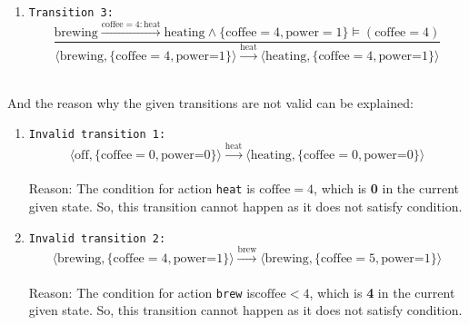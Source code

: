 \documentclass{article}
\begin{document}
\begin{enumerate}[(a)]
\begin{enumerate}[i]
        \item \texttt{Transition 3:}
        $$\frac{
            \text{brewing}\xrightarrow{\text{coffee}=4:\text{heat}} \text{heating}  \wedge \{\text{coffee}=4, \text{power}=1\} \models (\text{coffee}=4)
        }{
            \langle \text{brewing}, \{\text{coffee}=4, \text{power=1}\} \rangle 
            \xrightarrow{\text{heat}}
            \langle \text{heating}, \{\text{coffee}=4, \text{power=1}\} \rangle 
        }$$\\
    \end{enumerate}
    And the reason why the given transitions are not valid can be explained:
    \begin{enumerate}[i]
        \item \texttt{Invalid transition 1:}
        $$
            \langle \text{off}, \{\text{coffee}=0, \text{power=0}\} \rangle 
            \xrightarrow{\text{heat}}
            \langle \text{heating}, \{\text{coffee}=0, \text{power=0}\} \rangle $$\\
        Reason: The condition for action \texttt{heat} is \textbf{$\text{coffee}=4$}, which is \textbf{0} in the current given state. So, this transition cannot happen as it does not satisfy condition.\\
        
        \item \texttt{Invalid transition 2:}
        $$
            \langle \text{brewing}, \{\text{coffee}=4, \text{power=1}\} \rangle 
            \xrightarrow{\text{brew}}
            \langle \text{brewing}, \{\text{coffee}=5, \text{power=1}\} \rangle $$\\
        Reason: The condition for action \texttt{brew} is\textbf{$\text{coffee}<4$}, which is \textbf{4} in the current given state. So, this transition cannot happen as it does not satisfy condition.
    \end{enumerate}


\end{enumerate}
\end{document}

